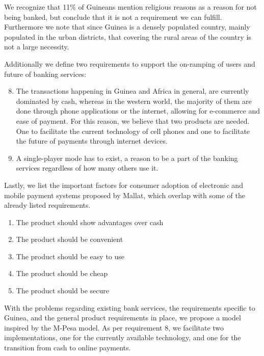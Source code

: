 \documentclass[11pt, a4paper]{article}
\begin{document}
We recognize that 11\% of Guineans mention religious reasons as a reason for not being banked, but conclude that it is not a requirement we can fulfill. Furthermore we note that since Guinea is a densely populated country, mainly populated in the urban districts, that covering the rural areas of the country is not a large necessity.

Additionally we define two requirements to support the on-ramping of users and future of banking services:

\begin{enumerate}
  \setcounter{enumi}{7}
  \item The transactions happening in Guinea and Africa in general, are currently dominated by cash, whereas in the western world, the majority of them are done through phone applications or the internet, allowing for e-commerce and ease of payment. For this reason, we believe that two products are needed. One to facilitate the current technology of cell phones and one to facilitate the future of payments through internet devices.
  \item A single-player mode has to exist, a reason to be a part of the banking services regardless of how many others use it.
\end{enumerate}

Lastly, we list the important factors for consumer adoption of electronic and mobile payment systems proposed by Mallat\cite{Mallat}, which overlap with some of the already listed requirements.
\begin{enumerate}
  \item The product should show advantages over cash
  \item The product should be convenient
  \item The product should be easy to use
  \item The product should be cheap
  \item The product should be secure
\end{enumerate}

With the problems regarding existing bank services, the requirements specific to Guinea, and the general product requirements in place, we propose a model inspired by the M-Pesa model. As per requirement 8, we facilitate two implementations, one for the currently available technology, and one for the transition from cash to online payments.
\end{document}
